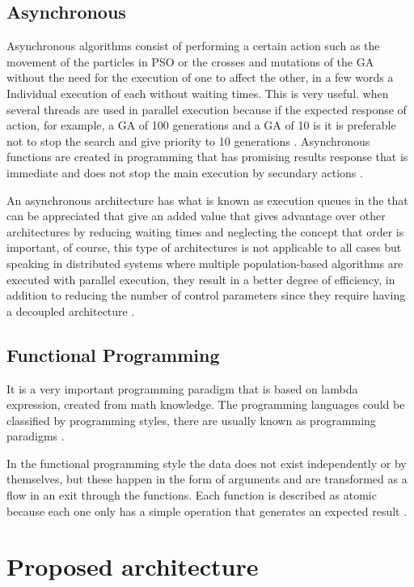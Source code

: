 \documentclass[runningheads]{llncs}
\begin{document}
\subsection{Asynchronous}
Asynchronous algorithms consist of performing a certain action such as the
movement of the particles in PSO or the crosses and mutations of the GA without
the need for the execution of one to affect the other, in a few words a
Individual execution of each without waiting times. This is very useful. when
several threads are used in parallel execution because if the expected response
of action, for example, a GA of 100 generations and a GA of 10 is it is
preferable not to stop the search and give priority to 10 generations
\cite{Santander-jim2018,Sherry2012,Goebel2016,Guerv2018}. Asynchronous functions
are created in programming that has promising results response that is immediate
and does not stop the main execution by secundary actions
\cite{Ambler2015}.

An asynchronous architecture has what is known as execution queues in the that
can be appreciated that give an added value that gives advantage over other
architectures by reducing waiting times and neglecting the concept that order is
important, of course, this type of architectures is not applicable to all cases
but speaking in distributed systems where multiple population-based algorithms
are executed with parallel execution, they result in a better degree of
efficiency, in addition to reducing the number of control parameters since they
require having a decoupled architecture \cite{Ma2019,Santander-jim2018}.

\subsection{Functional Programming}

It is a very important programming paradigm that is based on lambda expression,
created from math knowledge. The programming languages could be classified by
programming styles, there are usually known as programming paradigms
\cite{Kunasaikaran2016}.

In the functional programming style the data does not exist independently or by
themselves, but these happen in the form of arguments and are transformed as a
flow in an exit through the functions. Each function is described as atomic
because each one only has a simple operation that generates an expected result
\cite{Kunasaikaran2016}.


\section{Proposed architecture}
\label{sec:architecture}
\end{document}
